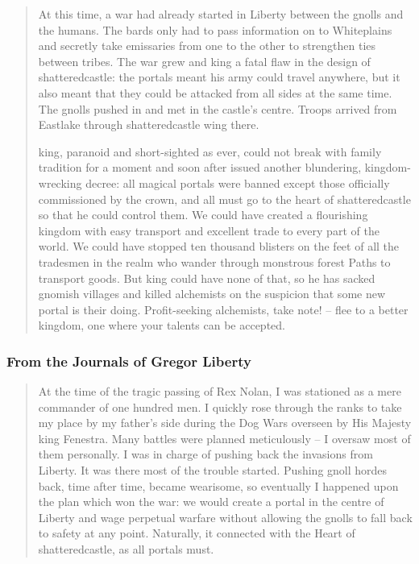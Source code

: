 \begin{multicols}{2}
\begin{quotation}
  At this time, a war had already started in Liberty between the gnolls and the humans.
  The bards only had to pass information on to Whiteplains and secretly take emissaries from one to the other to strengthen ties between tribes.
  The war grew and \gls{king} a fatal flaw in the design of \gls{shatteredcastle}: the portals meant his army could travel anywhere, but it also meant that they could be attacked from all sides at the same time.
  The gnolls pushed in and met in the castle's centre.
  Troops arrived from Eastlake through \gls{shatteredcastle} wing there.

  \Gls{king}, paranoid and short-sighted as ever, could not break with family tradition for a moment and soon after issued another blundering, kingdom-wrecking decree: all magical portals were banned except those officially commissioned by the crown, and all must go to the heart of \gls{shatteredcastle} so that he could control them.
  We could have created a flourishing kingdom with easy transport and excellent trade to every part of the world.
  We could have stopped ten thousand blisters on the feet of all the tradesmen in the realm who wander through monstrous forest Paths to transport goods.
  But \gls{king} could have none of that, so he has sacked gnomish villages and killed alchemists on the suspicion that some new portal is their doing.
  Profit-seeking alchemists, take note! -- flee to a better kingdom, one where your talents can be accepted.

\end{quotation}

\subsubsection{From the Journals of Gregor Liberty}


\begin{quotation}

  At the time of the tragic passing of Rex Nolan, I was stationed as a mere commander of one hundred men.
  I quickly rose through the ranks to take my place by my father's side during the Dog Wars overseen by His Majesty \gls{king} Fenestra.
  Many battles were planned meticulously -- I oversaw most of them personally.
  I was in charge of pushing back the invasions from Liberty.
  It was there most of the trouble started.
  Pushing gnoll hordes back, time after time, became wearisome, so eventually I happened upon the plan which won the war: we would create a portal in the centre of Liberty and wage perpetual warfare without allowing the gnolls to fall back to safety at any point.
  Naturally, it connected with the Heart of \gls{shatteredcastle}, as all portals must.


\end{quotation}
\end{multicols}

